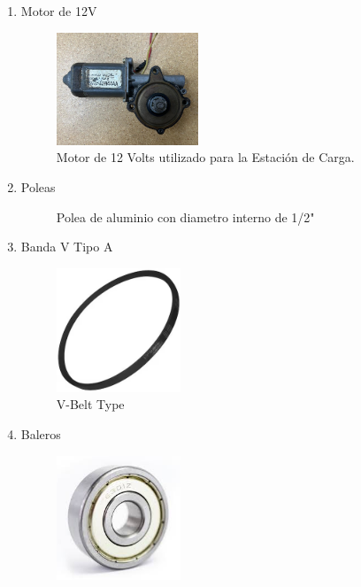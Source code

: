     \begin{enumerate}
        \item Motor de 12V
            \begin{figure}[htpb]
                \centering
                \includegraphics[width=0.4\textwidth]{MECANISMO/MOTOR_12V.jpg}
                \caption{Motor de 12 Volts utilizado para la Estación de Carga.}
                \label{fig:etiqueta}
            \end{figure}
        \item Poleas
            \begin{figure}[htpb]
                \centering
                \caption{Polea de aluminio con diametro interno de 1/2"}
                \label{fig:etiqueta}
            \end{figure}
        \item Banda V Tipo A
        \begin{figure}[htpb]
                \centering
                \includegraphics[width=0.35\textwidth]{MECANISMO/BANDA_V_TIPOA-transformed.jpg}
                \caption{V-Belt Type }
                \label{fig:etiqueta}
            \end{figure}
        \item Baleros
        \begin{figure}[htpb]
                \centering
                \includegraphics[width=0.35\textwidth]{MECANISMO/balero.jpeg}

\end{figure}
\end{enumerate}
